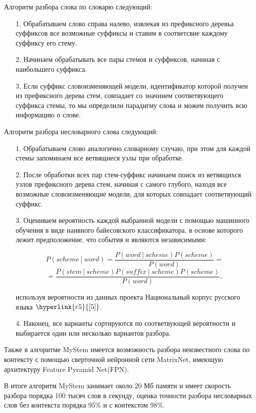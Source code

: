 \documentclass[12pt, a4paper]{article}
\begin{document}
Алгоритм разбора слова по словарю следующий:

\begin{enumerate}
\item[1.] Обрабатываем слово справа налево, извлекая из префиксного деревьа суффиксов все возможные суффиксы и ставим в соответсвие каждому суффиксу его стему.
\item[2.] Начинаем обрабатывать все пары стемов и суффиксов, начиная с наибольшего суффикса.
\item[3.] Если суффикс словоизменяющей модели, идентификатор которой получен из префиксного дерева стем, совпадает со значнием соответвующего суффикса стемы, то мы определили парадигму слова и можем получить всю информацию о слове.
\end{enumerate}

Алгоритм разбора несловарного слова следующий:
\begin{enumerate}
\item[1.] Обрабатываем слово аналогично словарному случаю, при этом для каждой стемы запоминаем все ветвящиеся узлы при обработке.
\item[2.] После обработки всех пар стем-суффикс начинаем поиск из ветвящихся узлов префиксного дерева стем, начиная с самого глубого, находя все возможные словоизменяющие модели, для которых совпадает соответвующий суффикс.
\item[3.] Оцениваем вероятность каждой выбранной модели с помощью машинного обучения в виде наивного байесовского классификатора, в основе которого лежит предположение, что события  и  являются независимыми:

$$P(scheme\:|\:word) = \frac{P(word\:|\:scheme)P(scheme)}{P(word)} = $$
$$ = \frac{P(stem\:|\:scheme)P(suffix\:|\:scheme)P(scheme)}{P(word)},$$

используя вероятности из данных проекта Национальный корпус русского языка $\hyperlink{r5}{[5]}$.

\item[4.] Наконец, все варианты сортируются по соответвующей вероятности и выбирается один или несколько вариантов разбора.

\end{enumerate}

Также в алгоритме MyStem имеется возможность разбора неизвестного слова по контексту с помощью сверточной нейронной сети MatrixNet, имеющую архитектуру Feature Pyramid Net(FPN). 

В итоге алгоритм MyStem занимает около 20 Мб памяти и имеет скорость разбора порядка 100 тысяч слов в секунду, оценка точности разбора несловарных слов без контекста порядка 95\% и с контекстом 98\%.
\end{document}
